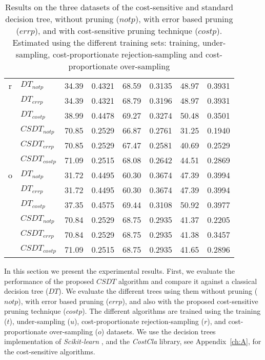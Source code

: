 \begin{table}
\begin{tabular}{|c|l|c c|c c |c c|}
    \hline
    r&$DT_{not p}$& 34.39&0.4321&68.59&0.3135&48.97&0.3931\\
    &$DT_{err p}$&  34.39&0.4321&68.79&0.3196&48.97&0.3931\\
    &$DT_{cost p}$& 38.99&0.4478&69.27&0.3274&50.48&0.3501\\
    &$CSDT_{not p}$&  70.85&0.2529&66.87&0.2761&31.25&0.1940\\
    &$CSDT_{err p}$&  70.85&0.2529&67.47&0.2581&40.69&0.2529\\
    &$CSDT_{cost p}$& 71.09&0.2515&68.08&0.2642&44.51&0.2869\\
    \hline
    o&$DT_{not p}$& 31.72&0.4495&60.30&0.3674&47.39&0.3994\\
    &$DT_{err p}$&  31.72&0.4495&60.30&0.3674&47.39&0.3994\\
    &$DT_{cost p}$& 37.35&0.4575&69.44&0.3108&50.92&0.3977\\
    &$CSDT_{not p}$&  70.84&0.2529&68.75&0.2935&41.37&0.2205\\
    &$CSDT_{err p}$&  70.84&0.2529&68.75&0.2935&41.38&0.3457\\
    &$CSDT_{cost p}$& 71.09&0.2515&68.75&0.2935&41.65&0.2896\\
    \hline
  \end{tabular} 
    \caption{Results on the three datasets of the cost-sensitive and standard decision tree,    
  without pruning ($not p$), with error based pruning ($err p$), and with cost-sensitive pruning 
  technique ($cost p$). Estimated using the different training sets: training, under-sampling, 
  cost-proportionate rejection-sampling and cost-proportionate over-sampling}
  \label{tab:8:1}
\end{table}

In this section we present the experimental results. First, we evaluate the performance of the 
proposed $CSDT$ algorithm and compare it against a classical decision tree ($DT$). We evaluate 
the different trees using them without pruning ($not p$), with error based pruning ($err p$), 
and also with the proposed cost-sensitive pruning technique ($cost p$). The different algorithms 
are trained using the training ($t$), under-sampling ($u$), cost-proportionate rejection-sampling 
($r$), and cost-proportionate over-sampling ($o$) datasets. We use the decision trees 
implementation of \textit{Scikit-learn} \citep{Pedregosa2011}, and the \textit{CostCla} library, 
see Appendix~\ref{ch:A}, for the cost-sensitive algorithms.

